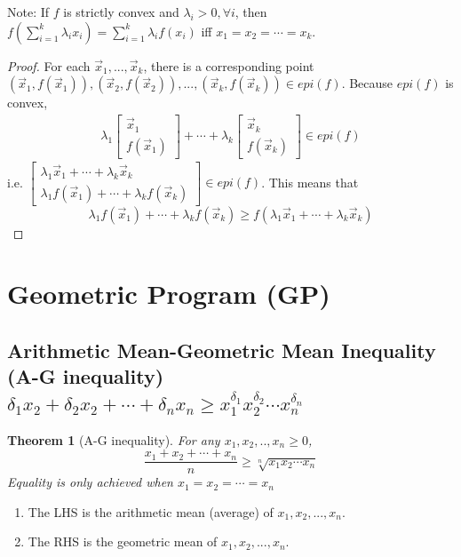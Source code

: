 \documentclass[11pt,a4paper]{article}
\newtheorem{theorem}{Theorem}
\begin{document}
Note: If $f$ is strictly convex and $\lambda_i>0,\forall i$, then $f(\sum_{i=1}^k\lambda_i x_i)= \sum_{i=1}^k\lambda_if(x_i)$ iff $x_1=x_2=\cdots=x_k$.
\begin{proof}
    For each $\vec{x}_1,...,\vec{x}_k$, there is a corresponding point $(\vec{x}_1,f(\vec{x}_1)),(\vec{x}_2,f(\vec{x}_2)),...,(\vec{x}_k,f(\vec{x}_k))\in {epi}(f)$. Because ${epi}(f)$ is convex,
    \begin{equation}
        \begin{aligned}
            \lambda_1 \begin{bmatrix}
                \vec{x}_1\\
                f(\vec{x}_1)
            \end{bmatrix}+\cdots+\lambda_k \begin{bmatrix}
                \vec{x}_k\\
                f(\vec{x}_k)
            \end{bmatrix}\in {epi}(f)
        \end{aligned}
        \nonumber
    \end{equation}
    i.e. $\begin{bmatrix}
        \lambda_1\vec{x}_1+\cdots+\lambda_k\vec{x}_k\\
        \lambda_1f(\vec{x}_1)+\cdots+\lambda_kf(\vec{x}_k)
    \end{bmatrix}\in{epi}(f)$. This means that $$\lambda_1f(\vec{x}_1)+\cdots+\lambda_k f(\vec{x}_k)\geq f(\lambda_1\vec{x}_1+\cdots+\lambda_k\vec{x}_k)$$
\end{proof}

\section{Geometric Program (GP)}

\subsection{Arithmetic Mean-Geometric Mean Inequality (A-G inequality) $\delta_1x_2+\delta_2x_2+\cdots+\delta_nx_n\geq x_1^{\delta_1}x_2^{\delta_2}\cdots x_n^{\delta_n}$}
\begin{theorem}[A-G inequality]
For any $x_1,x_2,..,x_n\geq 0$, $$\frac{x_1+x_2+\cdots+x_n}{n}\geq \sqrt[n]{x_1x_2\cdots x_n}$$
Equality is only achieved when $x_1=x_2=\cdots=x_n$
\end{theorem}
\begin{enumerate}[$\bullet$]
    \item The LHS is the arithmetic mean (average) of $x_1,x_2,...,x_n$.
    \item The RHS is the geometric mean of $x_1,x_2,...,x_n$.
\end{enumerate}
\end{document}
